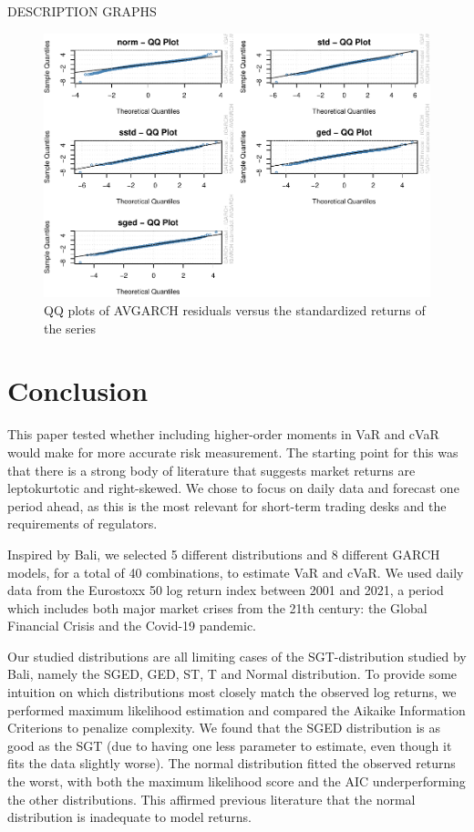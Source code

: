 \documentclass[a4paper, nobind]{templates/ociamthesis}
\begin{document}
DESCRIPTION GRAPHS

\begin{figure}[h]

{\centering \includegraphics[width=1\linewidth]{_main_files/figure-latex/figuresqq-1} 

}

\caption{QQ plots of AVGARCH residuals versus the standardized returns of the series}\label{fig:figuresqq}
\end{figure}

\hypertarget{Conclusion}{%
\chapter{Conclusion}\label{Conclusion}}

This paper tested whether including higher-order moments in VaR and cVaR would make for more accurate risk measurement. The starting point for this was that there is a strong body of literature that suggests market returns are leptokurtotic and right-skewed. We chose to focus on daily data and forecast one period ahead, as this is the most relevant for short-term trading desks and the requirements of regulators.

Inspired by Bali, we selected 5 different distributions and 8 different GARCH models, for a total of 40 combinations, to estimate VaR and cVaR. We used daily data from the Eurostoxx 50 log return index between 2001 and 2021, a period which includes both major market crises from the 21th century: the Global Financial Crisis and the Covid-19 pandemic.

Our studied distributions are all limiting cases of the SGT-distribution studied by Bali, namely the SGED, GED, ST, T and Normal distribution. To provide some intuition on which distributions most closely match the observed log returns, we performed maximum likelihood estimation and compared the Aikaike Information Criterions to penalize complexity. We found that the SGED distribution is as good as the SGT (due to having one less parameter to estimate, even though it fits the data slightly worse). The normal distribution fitted the observed returns the worst, with both the maximum likelihood score and the AIC underperforming the other distributions. This affirmed previous literature that the normal distribution is inadequate to model returns.
\end{document}
